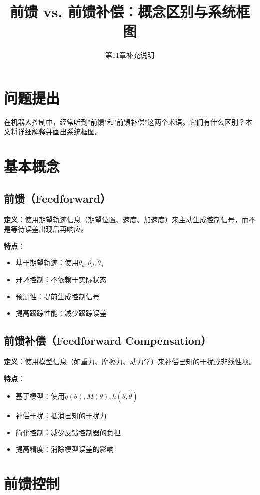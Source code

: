 \documentclass[12pt,a4paper]{article}
\title{前馈 vs. 前馈补偿：概念区别与系统框图}
\author{第11章补充说明}
\date{}
\begin{document}
\maketitle

\section{问题提出}

在机器人控制中，经常听到"前馈"和"前馈补偿"这两个术语。它们有什么区别？本文将详细解释并画出系统框图。

\section{基本概念}

\subsection{前馈（Feedforward）}

\textbf{定义}：使用期望轨迹信息（期望位置、速度、加速度）来主动生成控制信号，而不是等待误差出现后再响应。

\textbf{特点}：
\begin{itemize}
\item 基于期望轨迹：使用$\theta_d, \dot{\theta}_d, \ddot{\theta}_d$
\item 开环控制：不依赖于实际状态
\item 预测性：提前生成控制信号
\item 提高跟踪性能：减少跟踪误差
\end{itemize}

\subsection{前馈补偿（Feedforward Compensation）}

\textbf{定义}：使用模型信息（如重力、摩擦力、动力学）来补偿已知的干扰或非线性项。

\textbf{特点}：
\begin{itemize}
\item 基于模型：使用$\tilde{g}(\theta), \tilde{M}(\theta), \tilde{h}(\theta, \dot{\theta})$
\item 补偿干扰：抵消已知的干扰力
\item 简化控制：减少反馈控制器的负担
\item 提高精度：消除模型误差的影响
\end{itemize}

\section{前馈控制}
\end{document}
